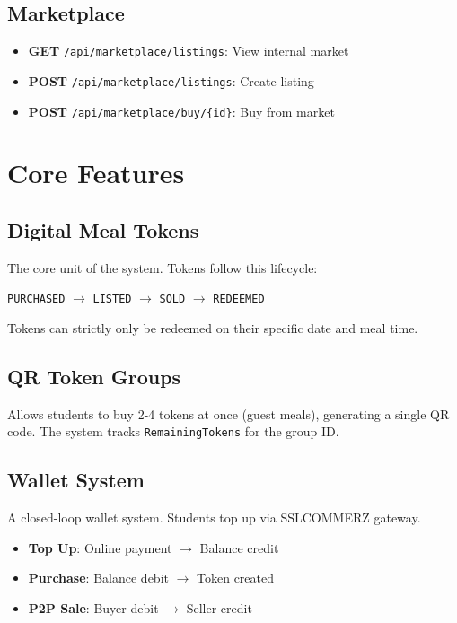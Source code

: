 \documentclass[11pt,a4paper]{report}
\begin{document}
\section{Marketplace}
\begin{itemize}
    \item \textbf{GET} \texttt{/api/marketplace/listings}: View internal market
    \item \textbf{POST} \texttt{/api/marketplace/listings}: Create listing
    \item \textbf{POST} \texttt{/api/marketplace/buy/\{id\}}: Buy from market
\end{itemize}

\chapter{Core Features}

\section{Digital Meal Tokens}
The core unit of the system. Tokens follow this lifecycle:
\begin{center}
\texttt{PURCHASED} $\rightarrow$ \texttt{LISTED} $\rightarrow$ \texttt{SOLD} $\rightarrow$ \texttt{REDEEMED}
\end{center}
Tokens can strictly only be redeemed on their specific date and meal time.

\section{QR Token Groups}
Allows students to buy 2-4 tokens at once (guest meals), generating a single QR code. The system tracks \texttt{RemainingTokens} for the group ID.

\section{Wallet System}
A closed-loop wallet system. Students top up via SSLCOMMERZ gateway.
\begin{itemize}
    \item \textbf{Top Up}: Online payment $\rightarrow$ Balance credit
    \item \textbf{Purchase}: Balance debit $\rightarrow$ Token created
    \item \textbf{P2P Sale}: Buyer debit $\rightarrow$ Seller credit
\end{itemize}
\end{document}
